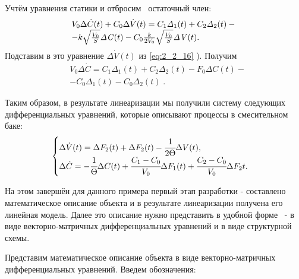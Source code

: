 		Учтём уравнения статики и отбросим \ остаточный член:
\begin{equation*}
\begin{matrix}V_0\Delta \dot C(t)+C_0\Delta \dot V(t)=C_1\mathit{\Delta  }_1(t)+C_2\mathit{\Delta  }_2(t)-\hfill\null \\-k\sqrt{\frac{V_0}
	S}\mathit{\Delta C}(t)-C_0\frac k{2V_0}\sqrt{\frac{V_0} S}\mathit{\Delta V}(t).\hfill\null \end{matrix}\hfill 
\end{equation*}
		Подставим в это уравнение  $\Delta \dot V(t)$ из \eqref{eq:2_2_16}%
		). Получим
\begin{align*}
&V_0\Delta \dot C=C_1\mathit{\Delta}_1(t)+C_2\mathit{\Delta}_2(t)-F_0\mathit{\Delta C}(t)-
\\&-C_0\mathit{\Delta  }_1(t)-C_0\mathit{\Delta}_2(t)\;.
\end{align*}

		Таким образом, в результате линеаризации мы получили систему следующих дифференциальных уравнений, которые описывают
		процессы в смесительном баке:
\begin{equation}
\begin{cases}\label{eq:smethitelbak}
	\Delta \dot{V}(t)=\Delta F_{2}(t)+\Delta F_{2}(t)-\cfrac{1}{2\Theta}\Delta V(t),\\
	\Delta \dot{C}=-\cfrac{1}{\Theta}\Delta C(t)+\cfrac{C_{1}-C_{0}}{V_{0}}\Delta F_{1}(t)+\cfrac{C_{2}-C_{0}}{V_{0}}\Delta F_{2}t.
\end{cases}
\end{equation}


		 На этом завершён для данного примера первый этап разработки - составлено математическое описание объекта и в
		результате линеаризации получена его линейная модель. Далее это описание нужно представить в удобной форме \ - в виде
		векторно-матричных дифференциальных уравнений и в виде структурной схемы.



	 Представим математическое описание объекта в виде векторно-матричных дифференциальных уравнений. Введем обозначения:



